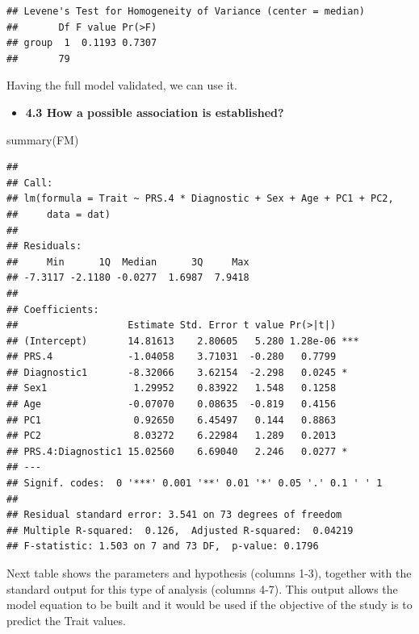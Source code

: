 \documentclass[
]{article}
\newenvironment{Shaded}{\begin{snugshade}}{\end{snugshade}}
\newcommand{\FunctionTok}[1]{\textcolor[rgb]{0.00,0.00,0.00}{#1}}
\newcommand{\NormalTok}[1]{#1}
\providecommand{\tightlist}{%
  \setlength{\itemsep}{0pt}\setlength{\parskip}{0pt}}
\begin{document}
\begin{verbatim}
## Levene's Test for Homogeneity of Variance (center = median)
##       Df F value Pr(>F)
## group  1  0.1193 0.7307
##       79
\end{verbatim}

\bigskip

Having the full model validated, we can use it.

\begin{itemize}
\tightlist
\item
  \textbf{4.3 How a possible association is established?}
\end{itemize}

\begin{Shaded}
\begin{Highlighting}[]
\FunctionTok{summary}\NormalTok{(FM)}
\end{Highlighting}
\end{Shaded}

\begin{verbatim}
## 
## Call:
## lm(formula = Trait ~ PRS.4 * Diagnostic + Sex + Age + PC1 + PC2, 
##     data = dat)
## 
## Residuals:
##     Min      1Q  Median      3Q     Max 
## -7.3117 -2.1180 -0.0277  1.6987  7.9418 
## 
## Coefficients:
##                   Estimate Std. Error t value Pr(>|t|)    
## (Intercept)       14.81613    2.80605   5.280 1.28e-06 ***
## PRS.4             -1.04058    3.71031  -0.280   0.7799    
## Diagnostic1       -8.32066    3.62154  -2.298   0.0245 *  
## Sex1               1.29952    0.83922   1.548   0.1258    
## Age               -0.07070    0.08635  -0.819   0.4156    
## PC1                0.92650    6.45497   0.144   0.8863    
## PC2                8.03272    6.22984   1.289   0.2013    
## PRS.4:Diagnostic1 15.02560    6.69040   2.246   0.0277 *  
## ---
## Signif. codes:  0 '***' 0.001 '**' 0.01 '*' 0.05 '.' 0.1 ' ' 1
## 
## Residual standard error: 3.541 on 73 degrees of freedom
## Multiple R-squared:  0.126,  Adjusted R-squared:  0.04219 
## F-statistic: 1.503 on 7 and 73 DF,  p-value: 0.1796
\end{verbatim}

Next table shows the parameters and hypothesis (columns 1-3), together
with the standard output for this type of analysis (columns 4-7). This
output allows the model equation to be built and it would be used if the
objective of the study is to predict the Trait values.
\end{document}
